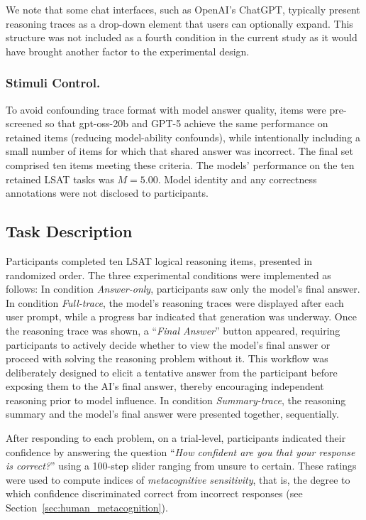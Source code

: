 \documentclass[manuscript,review,anonymous]{acmart}
\begin{document}
We note that some chat interfaces, such as OpenAI's ChatGPT, typically present reasoning traces as a drop-down element that users can optionally expand. This structure was not included as a fourth condition in the current study as it would have brought another factor to the experimental design. %


\subsubsection{Stimuli Control.}\label{sec:stimuli_control}
To avoid confounding trace format with model answer quality, items were pre-screened so that gpt-oss-20b and GPT-5 achieve the same performance on retained items (reducing model-ability confounds), while intentionally including a small number of items for which that shared answer was incorrect. The final set comprised ten items meeting these criteria. The models' performance on the ten retained LSAT tasks was $M=5.00$. Model identity and any correctness annotations were not disclosed to participants.

\subsection{Task Description}\label{sec:task-description}

Participants completed ten LSAT logical reasoning items, presented in randomized order. The three experimental conditions were implemented as follows: In condition \textit{Answer-only}, participants saw only the model's final answer. In condition \textit{Full-trace}, the model's reasoning traces were displayed after each user prompt, while a progress bar indicated that generation was underway. Once the reasoning trace was shown, a ``\textit{Final Answer}'' button appeared, requiring participants to actively decide whether to view the model's final answer or proceed with solving the reasoning problem without it. This workflow was deliberately designed to elicit a tentative answer from the participant before exposing them to the AI's final answer, thereby encouraging independent reasoning prior to model influence. In condition \textit{Summary-trace}, the reasoning summary and the model's final answer were presented together, sequentially.

After responding to each problem, on a trial-level, participants indicated their confidence by answering the question ``\textit{How confident are you that your response is correct?}'' using a 100-step slider ranging from unsure to certain. These ratings were used to compute indices of \textit{metacognitive sensitivity}, that is, the degree to which confidence discriminated correct from incorrect responses (see Section~\ref{sec:human_metacognition}).
\end{document}
